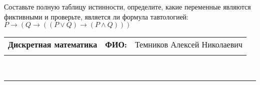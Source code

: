 \documentclass[10pt]{exam}
\newcommand{\class}{Дискретная математика}
\newcommand{\examdate}{}
\begin{document}
\begin{questions}
\begin{enumerate} [a)]
\end{enumerate}\question Составьте полную таблицу истинности, определите, какие переменные являются фиктивными и проверьте, является ли формула тавтологией:
$ P \rightarrow (Q \rightarrow ((P \lor Q) \rightarrow (P \land Q)))$

\end{questions}
\newpage
\begin{flushright}
\begin{tabular}{p{2.8in} r l}
\textbf{\class} & \textbf{ФИО:} &Темников Алексей Николаевич
\\

\textbf{\examdate} &&\\
\end{tabular}\\
\end{flushright}
\rule[1ex]{\textwidth}{.1pt}
\end{document}
